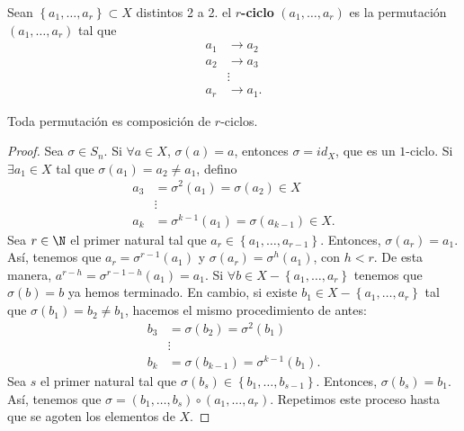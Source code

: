 \begin{fdefinition}[]
\normalfont Sean $\displaystyle \left\{ a_{1}, \ldots, a_{r}\right\} \subset X $ distintos 2 a 2. el \textbf{ $\displaystyle r $-ciclo} $\displaystyle \left(a_{1}, \ldots, a_{r}\right) $ es la permutación $\displaystyle \left(a_{1}, \ldots, a_{r}\right) $ tal que
\[
\begin{split}
	a_{1} & \to a_{2} \\
	a_{2} & \to a_{3} \\
	      & \vdots \\
	a_{r} & \to a_{1}.
\end{split}
\]
\end{fdefinition}

\begin{fprop}[]
\normalfont Toda permutación es composición de $\displaystyle r $-ciclos.
\end{fprop}

\begin{proof}
Sea $\displaystyle \sigma \in S_{n} $. Si $\displaystyle \forall a \in X $, $\displaystyle \sigma\left(a\right)=a $, entonces $\displaystyle \sigma = id _{X} $, que es un $\displaystyle 1 $-ciclo. Si $\displaystyle \exists a_{1}\in X $ tal que $\displaystyle \sigma\left(a_{1}\right) = a_{2}\neq a_{1} $, defino
\[
\begin{split}
	a_{3} & = \sigma^{2}\left(a_{1}\right) = \sigma\left(a_{2}\right) \in X \\
	      & \vdots \\
	a_{k} & = \sigma^{k-1}\left(a_{1}\right) = \sigma\left(a_{k-1}\right) \in X.
\end{split}
\]
Sea $\displaystyle r \in \N $ el primer natural tal que $\displaystyle a_{r} \in \left\{ a_{1}, \ldots, a_{r-1}\right\}  $. Entonces, $\displaystyle \sigma\left(a_{r}\right) = a_{1} $. Así, tenemos que $a_{r} = \sigma^{r-1}\left(a_{1}\right)$ y $\displaystyle \sigma\left(a_{r}\right) = \sigma^{h}\left(a_{1}\right) $, con $\displaystyle h < r $. De esta manera, $\displaystyle a^{r-h} = \sigma^{r-1-h}\left(a_{1}\right) = a_{1} $. Si $\displaystyle \forall b \in X - \left\{ a_{1}, \ldots, a_{r}\right\}  $ tenemos que $\displaystyle \sigma\left(b\right) = b $ ya hemos terminado. En cambio, si existe $\displaystyle b_{1} \in X - \left\{ a_{1}, \ldots, a_{r}\right\}  $ tal que $\displaystyle \sigma\left(b_{1}\right) = b_{2} \neq b_{1} $, hacemos el mismo procedimiento de antes:
\[
\begin{split}
	b_{3} & = \sigma\left(b_{2}\right) = \sigma^{2}\left(b_{1}\right) \\
				 & \vdots \\
	b_{k} & = \sigma\left(b_{k-1}\right) = \sigma^{k-1}\left(b_{1}\right).
\end{split}
\]
Sea $\displaystyle s $ el primer natural tal que $\displaystyle \sigma\left(b_{s}\right) \in \left\{ b_{1}, \ldots, b_{s-1}\right\}  $. Entonces, $\displaystyle \sigma\left(b_{s}\right)= b_{1} $. Así, tenemos que $\displaystyle \sigma = \left(b_{1}, \ldots, b_{s}\right) \circ \left(a_{1}, \ldots, a_{r}\right) $. Repetimos este proceso hasta que se agoten los elementos de $\displaystyle X $.
\end{proof}


